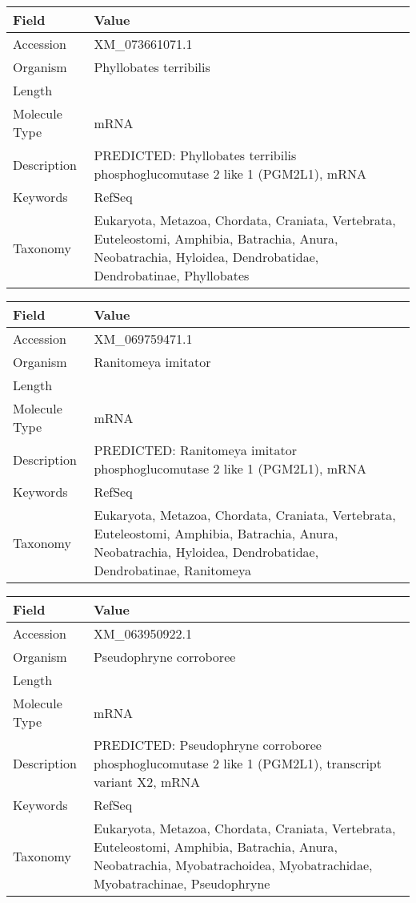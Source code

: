 \documentclass[10pt]{article}
\begin{document}
{\footnotesize
\begin{longtable}{>{\raggedright\arraybackslash}p{4.5cm} >{\raggedright\arraybackslash}p{11.5cm}}
\textbf{Field} & \textbf{Value} \\
\hline
Accession & XM\_073661071.1 \\
Organism & Phyllobates terribilis \\
Length & 4305 \\
Molecule Type & mRNA \\
Description & PREDICTED: Phyllobates terribilis phosphoglucomutase 2 like 1 (PGM2L1), mRNA \\
Keywords & RefSeq \\
Taxonomy & Eukaryota, Metazoa, Chordata, Craniata, Vertebrata, Euteleostomi, Amphibia, Batrachia, Anura, Neobatrachia, Hyloidea, Dendrobatidae, Dendrobatinae, Phyllobates \\
\end{longtable}
}

{\footnotesize
\begin{longtable}{>{\raggedright\arraybackslash}p{4.5cm} >{\raggedright\arraybackslash}p{11.5cm}}
\textbf{Field} & \textbf{Value} \\
\hline
Accession & XM\_069759471.1 \\
Organism & Ranitomeya imitator \\
Length & 6282 \\
Molecule Type & mRNA \\
Description & PREDICTED: Ranitomeya imitator phosphoglucomutase 2 like 1 (PGM2L1), mRNA \\
Keywords & RefSeq \\
Taxonomy & Eukaryota, Metazoa, Chordata, Craniata, Vertebrata, Euteleostomi, Amphibia, Batrachia, Anura, Neobatrachia, Hyloidea, Dendrobatidae, Dendrobatinae, Ranitomeya \\
\end{longtable}
}

{\footnotesize
\begin{longtable}{>{\raggedright\arraybackslash}p{4.5cm} >{\raggedright\arraybackslash}p{11.5cm}}
\textbf{Field} & \textbf{Value} \\
\hline
Accession & XM\_063950922.1 \\
Organism & Pseudophryne corroboree \\
Length & 7350 \\
Molecule Type & mRNA \\
Description & PREDICTED: Pseudophryne corroboree phosphoglucomutase 2 like 1 (PGM2L1), transcript variant X2, mRNA \\
Keywords & RefSeq \\
Taxonomy & Eukaryota, Metazoa, Chordata, Craniata, Vertebrata, Euteleostomi, Amphibia, Batrachia, Anura, Neobatrachia, Myobatrachoidea, Myobatrachidae, Myobatrachinae, Pseudophryne \\
\end{longtable}
}
\end{document}
